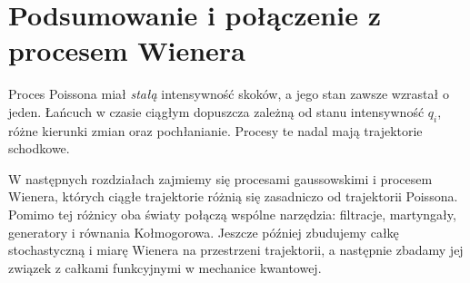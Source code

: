 \section{Podsumowanie i połączenie z procesem Wienera}
Proces Poissona miał \emph{stałą} intensywność skoków,
a jego stan zawsze wzrastał o jeden. Łańcuch w czasie
ciągłym dopuszcza zależną od stanu intensywność $q_i$,
różne kierunki zmian oraz pochłanianie. Procesy te nadal
mają trajektorie schodkowe.

W następnych rozdziałach zajmiemy się procesami gaussowskimi
i procesem Wienera, których ciągłe trajektorie różnią się
zasadniczo od trajektorii Poissona. Pomimo tej różnicy
oba światy połączą wspólne narzędzia: filtracje, martyngały,
generatory i równania Kołmogorowa. Jeszcze później
zbudujemy całkę stochastyczną i miarę Wienera na przestrzeni
trajektorii, a następnie zbadamy jej związek z całkami
funkcyjnymi w mechanice kwantowej.


